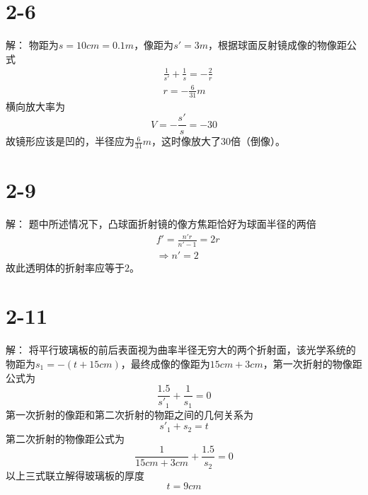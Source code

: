 \documentclass[10pt,a4paper]{article}
\theoremstyle{remark}
\begin{document}
\section*{2-6}解：
物距为$s = 10cm = 0.1m$，像距为$s' = 3m$，根据球面反射镜成像的物像距公式
\begin{align*}
&\frac{1}{s'} + \frac{1}{s} = -\frac{2}{r}\\
&r = -\frac{6}{31}m
\end{align*}
横向放大率为
\[
V = -\frac{s'}{s} = -30
\]
故镜形应该是凹的，半径应为$\frac{6}{31}m$，这时像放大了$30$倍（倒像）。
\section*{2-9}解：
题中所述情况下，凸球面折射镜的像方焦距恰好为球面半径的两倍
\begin{align*}
&f' = \frac{n'r}{n' - 1} = 2r\\
&\Longrightarrow n' = 2
\end{align*}
故此透明体的折射率应等于$2$。
\section*{2-11}解：
将平行玻璃板的前后表面视为曲率半径无穷大的两个折射面，该光学系统的物距为$s_1 =  -(t + 15cm)$，最终成像的像距为$15cm + 3cm$，第一次折射的物像距公式为
\[
\frac{1.5}{s'_1} + \frac{1}{s_1} = 0
\]
第一次折射的像距和第二次折射的物距之间的几何关系为
\[
s'_1 + s_2 = t
\]
第二次折射的物像距公式为
\[
\frac{1}{15cm + 3cm} + \frac{1.5}{s_2} = 0
\]
以上三式联立解得玻璃板的厚度
\[
t = 9cm
\]
\end{document}
